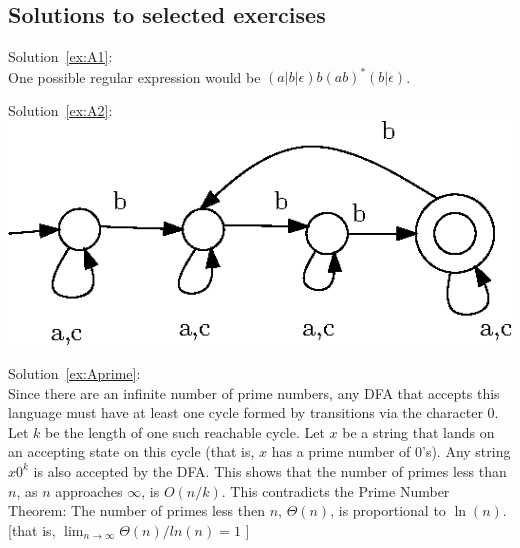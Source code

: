 \newpage
\subsection{Solutions to selected exercises}

\medskip
\noindent Solution~\ref{ex:A1}:\\
One possible regular expression would be $(a|b|\epsilon)b(ab)^*(b|\epsilon)$.

\medskip
\noindent Solution~\ref{ex:A2}:\\
 \includegraphics{figs/automata3k_b.eps}

\medskip
\noindent Solution~\ref{ex:Aprime}:\\
Since there are an infinite number of prime numbers, any DFA that
accepts this language must have at least one cycle formed by transitions
via the character 0.  Let $k$ be the length of one such reachable cycle.
Let $x$ be a string that lands on an accepting state on this cycle 
(that is, $x$ has a prime number of 0's).  Any string $x0^k$ is also accepted 
by the DFA.  This shows that the number of primes less than $n$, as $n$ 
approaches $\infty$, is $O(n/k)$.  This contradicts the Prime Number 
Theorem: The number of primes less then $n$, $\Theta(n)$, is proportional 
to $\ln(n)$.  [that is, $\lim_{n \rightarrow \infty } \Theta(n) / ln(n) = 1$ ]

